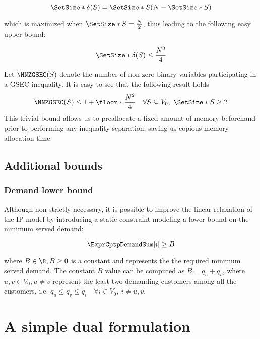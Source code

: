 \begin{equation}\label{eq:delta-s-set-size}
	\SetSize*{\delta(S)} = \SetSize*{S} (N - \SetSize*{S})
\end{equation}

which is maximized when $\SetSize*{S} = \frac{N}{2}$, thus leading to the following easy upper bound:

\begin{equation}\label{eq:delta-s-set-size-ub}
	\SetSize*{\delta(S)} \le \frac{N^2}{4}
\end{equation}

Let $\NNZGSEC(S)$ denote the number of non-zero binary variables participating in a GSEC inequality.
It is easy to see that the following result holds
\begin{equation}\label{eq:gsec-nnz-ub}
	\NNZGSEC(S) \le 1 + \floor*{\frac{N^2}{4}} \quad \forall S \subseteq V_0,\ \SetSize*{S} \ge 2
\end{equation}
This trivial bound allows us to preallocate a fixed amount of memory beforehand prior to performing any inequality separation, saving us copious memory allocation time.

\subsection{Additional bounds}

\subsubsection{Demand lower bound}\label{sec:demand-lower-bound}
Although non strictly-necessary, it is possible to improve the linear relaxation of the IP model by introducing a static constraint modeling a lower bound on the minimum served demand:

\begin{equation}\label{eq:resource-lower-bound-constraint}
	\ExprCptpDemandSum[i]   \ge B
\end{equation}

where $B \in \R, B \ge 0$ is a constant and represents the the required minimum served demand.
The constant $B$ value can be computed as $B = q_u + q_v$, where $u, v \in V_0, u \ne v$ represent the least two demanding customers among all the customers, i.e. $q_u \le q_v \le q_i \quad \forall i \in V_0,\ i \ne u, v$.

\section{A simple dual formulation}\label{sec:cptp-simple-dual-formulation}

